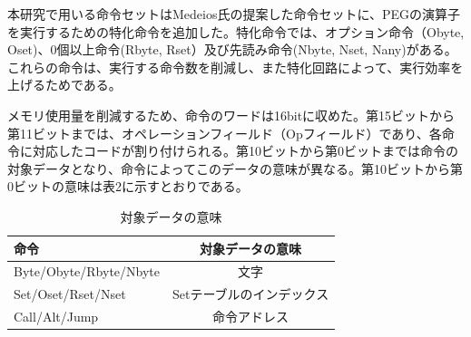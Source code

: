 \documentclass[submit]{ipsj}
\begin{document}
本研究で用いる命令セットはMedeios氏の提案した命令セットに、PEGの演算子を実行するための特化命令を追加した。特化命令では、オプション命令（Obyte, Oset)、0個以上命令(Rbyte, Rset）及び先読み命令(Nbyte, Nset, Nany)がある。これらの命令は、実行する命令数を削減し、また特化回路によって、実行効率を上げるためである。

メモリ使用量を削減するため、命令のワードは16bitに収めた。第15ビットから第11ビットまでは、オペレーションフィールド（Opフィールド）であり、各命令に対応したコードが割り付けられる。第10ビットから第0ビットまでは命令の対象データとなり、命令によってこのデータの意味が異なる。第10ビットから第0ビットの意味は表2に示すとおりである。

\begin{table}[h]
	\caption{対象データの意味}
	\centering
\begin{tabular}[t]{lc}
	\hline\hline
	 命令 & 対象データの意味 \\\hline
	 Byte/Obyte/Rbyte/Nbyte & 文字 \\
	 Set/Oset/Rset/Nset & Setテーブルのインデックス \\
	 Call/Alt/Jump & 命令アドレス \\\hline
\end{tabular}
\end{table}



\end{document}
